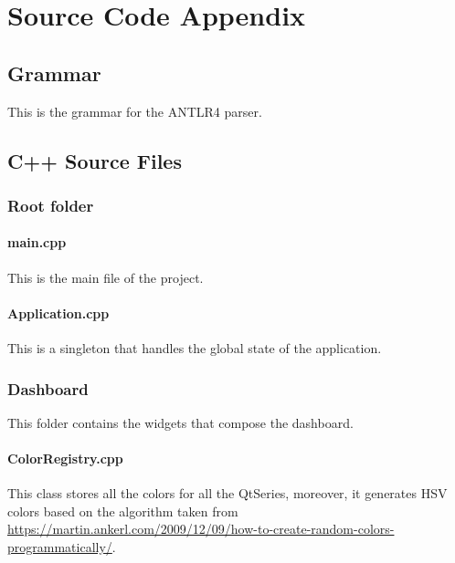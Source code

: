 
\part{Source Code Appendix}

\chapter{Grammar} \label{app:grammar}
This is the grammar for the ANTLR4 parser.


\chapter{C++ Source Files}

\section{Root folder}

\subsection{main.cpp}
This is the main file of the project.


\subsection{Application.cpp}

This is a singleton that handles the global state of the application.



\section{Dashboard}
This folder contains the widgets that compose the dashboard.

\subsection{ColorRegistry.cpp} \label{code:coder}
\sloppy This class stores all the colors for all the QtSeries, moreover, it generates HSV colors based on the algorithm taken from \url{https://martin.ankerl.com/2009/12/09/how-to-create-random-colors-programmatically/}.


